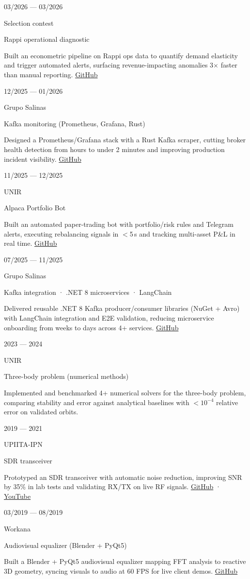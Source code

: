 \documentclass[%
               singlesided,
               paper=a4,
               fontsize=9pt
              ]{my-resume}
\renewcommand{\job}[4]{%
    \needspace{4\baselineskip}%
    \setlength{\jobdateplacelength}{0.29\linewidth}%
    \setlength{\jobpositionlength}{0.71\linewidth}%
    \begin{minipage}[t]{\jobdateplacelength}%
        \raggedright
        \footnotesize
        \begin{minipage}[t]{3mm}%
            \makebox[3mm][c]{\faCalendar}
        \end{minipage}%
        \hspace{0.4em}%
        \begin{minipage}[t]{\dimexpr \jobdateplacelength-3mm-0.4em}%
            #1
        \end{minipage}%
        \par\vspace{0.05em}
        \begin{minipage}[t]{3mm}%
            \makebox[3mm][c]{\faMapMarker}
        \end{minipage}%
        \hspace{0.4em}%
        \begin{minipage}[t]{\dimexpr \jobdateplacelength-3mm-0.4em}%
            #2
        \end{minipage}%
    \end{minipage}%
    \begin{minipage}[t]{\jobpositionlength}%
        \raggedright
        {\normalsize \color{emphasis} #3}
    \end{minipage}%
    \ifstrequal{#4}{}{}{\par\vspace{0.04em}\begingroup\footnotesize\raggedright #4\endgroup}
    \par\normalsize\vspace{0.12em}
}
\begin{document}
{    \job{03/2026 --- 03/2026}
        {Selection contest}
        {Rappi operational diagnostic}
        {Built an econometric pipeline on Rappi ops data to quantify demand elasticity and trigger automated alerts, surfacing revenue-impacting anomalies 3$\times$ faster than manual reporting. \href{https://github.com/sigmadg/rappi-case}{GitHub}}

    \job{12/2025 --- 01/2026}
        {Grupo Salinas}
        {Kafka monitoring (Prometheus, Grafana, Rust)}
        {Designed a Prometheus/Grafana stack with a Rust Kafka scraper, cutting broker health detection from hours to under 2 minutes and improving production incident visibility. \href{https://github.com/sigmadg/Rust_Grafana}{GitHub}}

    \job{11/2025 --- 12/2025}
        {UNIR}
        {Alpaca Portfolio Bot}
        {Built an automated paper-trading bot with portfolio/risk rules and Telegram alerts, executing rebalancing signals in $<$5\,s and tracking multi-asset P\&L in real time. \href{https://github.com/sigmadg/alpaca-portfolio-bot}{GitHub}}

    \job{07/2025 --- 11/2025}
        {Grupo Salinas}
        {Kafka integration · .NET 8 microservices · LangChain}
        {Delivered reusable .NET 8 Kafka producer/consumer libraries (NuGet + Avro) with LangChain integration and E2E validation, reducing microservice onboarding from weeks to days across 4+ services. \href{https://github.com/sigmadg/Kafka_librer-as_productores}{GitHub}}

    \job{2023 --- 2024}
        {UNIR}
        {Three-body problem (numerical methods)}
        {Implemented and benchmarked 4+ numerical solvers for the three-body problem, comparing stability and error against analytical baselines with $<10^{-4}$ relative error on validated orbits.}

    \job{2019 --- 2021}
        {UPIITA-IPN}
        {SDR transceiver}
        {Prototyped an SDR transceiver with automatic noise reduction, improving SNR by 35\% in lab tests and validating RX/TX on live RF signals. \href{https://github.com/sigmadg/transceiver}{GitHub} · \href{https://www.youtube.com/watch?v=uf3WM0KGN4k}{YouTube}}

    \job{03/2019 --- 08/2019}
        {Workana}
        {Audiovisual equalizer (Blender + PyQt5)}
        {Built a Blender + PyQt5 audiovisual equalizer mapping FFT analysis to reactive 3D geometry, syncing visuals to audio at 60 FPS for live client demos. \href{https://github.com/sigmadg/ecualizador}{GitHub}}

}
\end{document}

